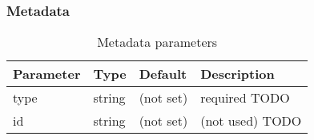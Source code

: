 \subsubsection{Metadata}%
\label{sec:conf-file:metadata}

\begin{preserve}
\begin{table}[!ht]
  \begin{center}
    \begin{tabularx}{\textwidth}{lllX}
      Parameter & Type   & Default   & Description     \\ 
      \hline
      type      & string & (not set) & required TODO   \\ 
      id        & string & (not set) & (not used) TODO \\ 
    \end{tabularx}
  \end{center}
  \caption{Metadata parameters}%
  \label{tab:metadata_params}
\end{table}
\end{preserve}

